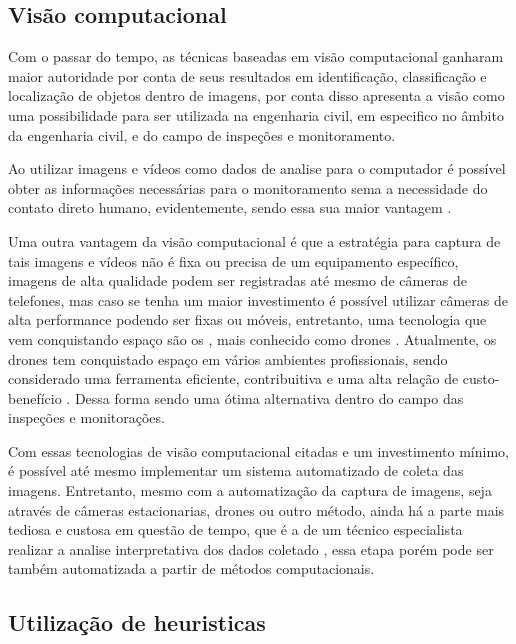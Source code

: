 
\subsection{Visão computacional}

Com o passar do tempo, as técnicas baseadas em visão computacional ganharam maior autoridade por conta de seus resultados em identificação, classificação e localização de objetos dentro de imagens, por conta disso  apresenta a visão como uma possibilidade para ser utilizada na engenharia civil, em especifico no âmbito da engenharia civil, e do campo de inspeções e monitoramento.

Ao utilizar imagens e vídeos como dados de analise para o computador é possível obter as informações necessárias para o monitoramento \cite{spencer2019advances} sema a necessidade do contato direto humano, evidentemente, sendo essa sua maior vantagem \cite{catbas2018vision}.

Uma outra vantagem da visão computacional é que a estratégia para captura de tais imagens e vídeos não é fixa ou precisa de um equipamento específico, imagens de alta qualidade podem ser registradas até mesmo de câmeras de telefones, mas caso se tenha um maior investimento é possível utilizar câmeras de alta performance podendo ser fixas ou móveis, entretanto, uma tecnologia que vem conquistando espaço são os , mais conhecido como drones \cite{dorafshan2018bridge}. Atualmente, os drones tem conquistado espaço em vários ambientes profissionais, sendo considerado uma ferramenta eficiente, contribuitiva e uma alta relação de custo-benefício \cite{zoubir2021crack}. 
Dessa forma sendo uma ótima alternativa dentro do campo das inspeções e monitorações. 

Com essas tecnologias de visão computacional citadas e um investimento mínimo, é possível até mesmo implementar um sistema automatizado de coleta das imagens. Entretanto, mesmo com a automatização da captura de imagens, seja através de câmeras estacionarias, drones ou outro método, ainda há a parte mais tediosa e custosa em questão de tempo, que é a de um técnico especialista realizar a analise interpretativa dos dados coletado \cite{zoubir2021crack}, essa etapa porém pode ser também automatizada a partir de métodos computacionais.

\subsection{Utilização de heuristicas}

